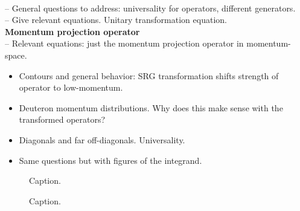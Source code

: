 \documentclass[preprintnumbers,floatfix,aps,prc,preprint,nofootinbib]{revtex4-1}
\begin{document}
\\
-- General questions to address: universality for operators, different generators.
\\
-- Give relevant equations. Unitary transformation equation.
\\
\textbf{Momentum projection operator}
\\
-- Relevant equations: just the momentum projection operator in momentum-space.
%
\begin{itemize}
	\item Contours and general behavior: SRG transformation shifts strength of operator to low-momentum.
	\item Deuteron momentum distributions. Why does this make sense with the transformed operators?
	\item Diagonals and far off-diagonals. Universality.
	\item Same questions but with figures of the integrand.
\end{itemize}
%
\begin{figure}[H]
	\centering
	
	\caption{Caption.}
	\label{fig:momentum_projection_contours_q0,30_3S1_RKE}
\end{figure}
%
\begin{figure}[H]
	\centering
	
	\caption{Caption.}
	\label{fig:momentum_projection_contours_q3,00_3S1_RKE}
\end{figure}
\end{document}
